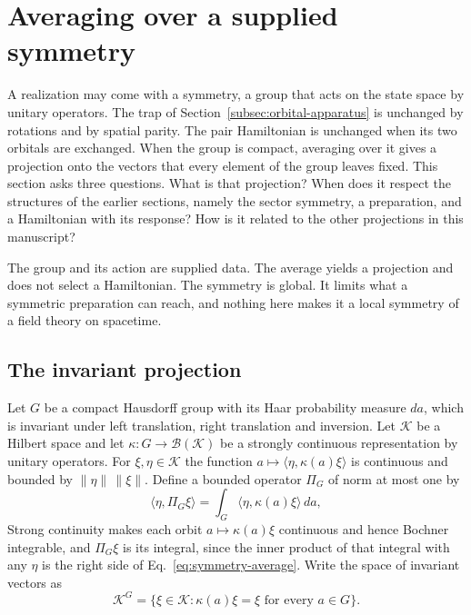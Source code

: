 \section{Averaging over a supplied symmetry}
\label{sec:symmetry-average}

A realization may come with a symmetry, a group that acts on the state space by unitary operators. The trap of Section~\ref{subsec:orbital-apparatus} is unchanged by rotations and by spatial parity. The pair Hamiltonian is unchanged when its two orbitals are exchanged. When the group is compact, averaging over it gives a projection onto the vectors that every element of the group leaves fixed. This section asks three questions. What is that projection? When does it respect the structures of the earlier sections, namely the sector symmetry, a preparation, and a Hamiltonian with its response? How is it related to the other projections in this manuscript?

The group and its action are supplied data. The average yields a projection and does not select a Hamiltonian. The symmetry is global. It limits what a symmetric preparation can reach, and nothing here makes it a local symmetry of a field theory on spacetime.

\subsection{The invariant projection}
\label{subsec:symmetry-projection}

Let $G$ be a compact Hausdorff group with its Haar probability measure $da$, which is invariant under left translation, right translation and inversion. Let $\mathcal K$ be a Hilbert space and let $\kappa:G\to\mathcal B(\mathcal K)$ be a strongly continuous representation by unitary operators. For $\xi,\eta\in\mathcal K$ the function $a\mapsto\langle\eta,\kappa(a)\xi\rangle$ is continuous and bounded by $\|\eta\|\,\|\xi\|$. Define a bounded operator $\Pi_G$ of norm at most one by
\begin{equation}
 \langle\eta,\Pi_G\xi\rangle=\int_G\langle\eta,\kappa(a)\xi\rangle\,da ,
 \label{eq:symmetry-average}
\end{equation}
Strong continuity makes each orbit $a\mapsto\kappa(a)\xi$ continuous and hence Bochner integrable, and $\Pi_G\xi$ is its integral, since the inner product of that integral with any $\eta$ is the right side of Eq.~\eqref{eq:symmetry-average}. Write the space of invariant vectors as
\begin{equation}
 \mathcal K^G=\{\xi\in\mathcal K:\kappa(a)\xi=\xi\text{ for every }a\in G\}.
 \label{eq:symmetry-invariant-space}
\end{equation}


